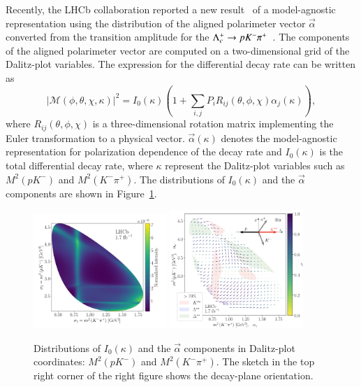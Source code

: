 Recently, the LHCb collaboration reported a new result~\cite{LHCb:2023crj} of a model-agnostic representation using the distribution of the aligned polarimeter vector $\vec{\alpha}$ converted from the transition amplitude for the $\Lambda_{c}^{+} \rightarrow p K^- \pi^+$~\cite{LHCb:2022ouv}. The components of the aligned polarimeter vector are computed on a two-dimensional grid of the Dalitz-plot variables. The expression for the differential decay rate can be written as
\begin{equation}\label{eq:lhcb-decay-rate}
    |\mathcal{M}(\phi,\theta,\chi,\kappa)|^2 = I_{0}(\kappa)(1+ \sum_{i,j}P_iR_{ij}(\theta,\phi,\chi)\alpha_j(\kappa)),
\end{equation}
where $R_{ij}(\theta,\phi,\chi)$ is a three-dimensional rotation matrix implementing the Euler transformation to a physical vector. $\vec{\alpha}(\kappa)$ denotes the model-agnostic representation for polarization dependence of the decay rate and $I_0(\kappa)$ is the total differential decay rate, where $\kappa$ represent the Dalitz-plot variables such as $M^2(pK^-)$ and $M^2(K^-\pi^+)$. The distributions of $I_0(\kappa)$ and the $\vec{\alpha}$ components are shown in Figure~\ref{fig:lhcb-results}.
\begin{figure}[H]
    \centering
    \includegraphics[width=0.45\textwidth]{figure/polarimetery/LHCb/intensity-distribution.png}
    \includegraphics[width=0.45\textwidth]{figure/polarimetery/LHCb/total-polarimetry-field-watermark.png}
    \caption{Distributions of $I_0(\kappa)$ and the $\vec{\alpha}$ components in Dalitz-plot coordinates: $M^2(pK^-)$ and $M^2(K^-\pi^+)$. The sketch in the top right corner of the right figure shows the decay-plane orientation.}
    \label{fig:lhcb-results}
\end{figure}

